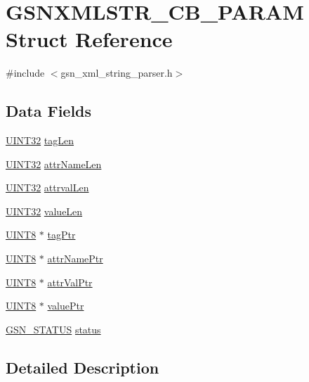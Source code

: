 \hypertarget{a00443}{
\section{GSNXMLSTR\_\-CB\_\-PARAM Struct Reference}
\label{a00443}
}


{\ttfamily \#include $<$gsn\_\-xml\_\-string\_\-parser.h$>$}

\subsection*{Data Fields}
\begin{DoxyCompactItemize}
\item 
\hyperlink{a00660_gae1e6edbbc26d6fbc71a90190d0266018}{UINT32} \hyperlink{a00443_a6ef02d18ce527c9522753f065487fcd5}{tagLen}
\item 
\hyperlink{a00660_gae1e6edbbc26d6fbc71a90190d0266018}{UINT32} \hyperlink{a00443_a4be0f80f4151640ff25949422d00ab62}{attrNameLen}
\item 
\hyperlink{a00660_gae1e6edbbc26d6fbc71a90190d0266018}{UINT32} \hyperlink{a00443_a863da8b68aa7398a50a156f7e53d0969}{attrvalLen}
\item 
\hyperlink{a00660_gae1e6edbbc26d6fbc71a90190d0266018}{UINT32} \hyperlink{a00443_a145cf46a49a2c1c6f2cfd0df668efdee}{valueLen}
\item 
\hyperlink{a00660_gab27e9918b538ce9d8ca692479b375b6a}{UINT8} $\ast$ \hyperlink{a00443_a7cf402fdd3455c46d9073935e5b44c77}{tagPtr}
\item 
\hyperlink{a00660_gab27e9918b538ce9d8ca692479b375b6a}{UINT8} $\ast$ \hyperlink{a00443_a110a752cd801c8e85115da8d85f639bb}{attrNamePtr}
\item 
\hyperlink{a00660_gab27e9918b538ce9d8ca692479b375b6a}{UINT8} $\ast$ \hyperlink{a00443_ad611971731c2ace7618b87b6114c3e5a}{attrValPtr}
\item 
\hyperlink{a00660_gab27e9918b538ce9d8ca692479b375b6a}{UINT8} $\ast$ \hyperlink{a00443_a860ec49aa5b63f34200ff0b4282fd47d}{valuePtr}
\item 
\hyperlink{a00660_gada5951904ac6110b1fa95e51a9ddc217}{GSN\_\-STATUS} \hyperlink{a00443_aa237e3d47ed706281c4aeb5c54e7cb03}{status}
\end{DoxyCompactItemize}


\subsection{Detailed Description}


